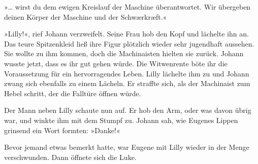 »\ldots{} wirst du dem ewigen Kreislauf der Maschine überantwortet. Wir
übergeben deinen Körper der Maschine und der Schwærkræft.«

»Lilly!«, rief Johann verzweifelt. Seine Frau hob den Kopf und
lächelte ihn an. Das teure Spitzenkleid ließ ihre Figur plötzlich
wieder sehr jugendhaft aussehen. Sie wollte zu ihm kommen, doch die
Machinaisten hielten sie zurück. Johann wusste jetzt, dass es ihr
gut gehen würde. Die Witwenrente böte ihr die Voraussetzung für ein
hervorragendes Leben. Lilly lächelte ihm zu und Johann zwang sich
ebenfalls zu einem Lächeln. Er straffte sich, als der Machinaist
zum Hebel schritt, der die Falltüre öffnen würde.

Der Mann neben Lilly schaute nun auf. Er hob den Arm, oder was
davon übrig war, und winkte ihm mit dem Stumpf zu. Johann sah, wie
Eugenes Lippen grinsend ein Wort formten: »Danke!«

\bigpar

Bevor jemand etwas bemerkt hatte, war Eugene mit Lilly wieder in
der Menge verschwunden. Dann öffnete sich die Luke.




